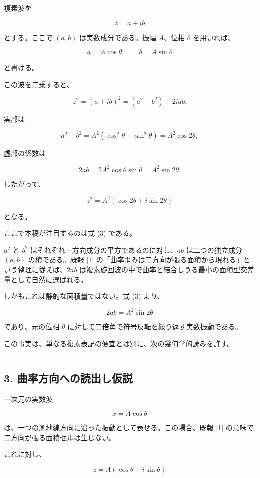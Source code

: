 \documentclass[
  a4paper,
]{ltjsarticle}
\begin{document}
複素波を

\[z=a+ib\]

とする。ここで \((a,b)\) は実数成分である。振幅 \(A\)、位相 \(\theta\)
を用いれば、

\[a=A\cos\theta,\qquad b=A\sin\theta\]

と書ける。

この波を二乗すると、

\[z^2 = (a+ib)^2 = (a^2-b^2)+2iab. \tag{1}\]

実部は

\[a^2-b^2 = A^2(\cos^2\theta-\sin^2\theta) = A^2\cos2\theta, \tag{2}\]

虚部の係数は

\[2ab = 2A^2\cos\theta\sin\theta = A^2\sin2\theta. \tag{3}\]

したがって、

\[\boxed{z^2=A^2(\cos2\theta+i\sin2\theta)} \tag{4}\]

となる。

ここで本稿が注目するのは式 (3) である。

\(a^2\) と \(b^2\) はそれぞれ一方向成分の平方であるのに対し、\(ab\)
は二つの独立成分 \((a,b)\) の積である。既報 {[}1{]}
の「曲率歪みは二方向が張る面積から現れる」という整理に従えば、\(2ab\)
は複素旋回波の中で曲率と結合しうる最小の面積型交差量として自然に選ばれる。

しかもこれは静的な面積量ではない。式 (3) より、

\[2ab=A^2\sin2\theta\]

であり、元の位相 \(\theta\)
に対して二倍角で符号反転を繰り返す実数振動である。

この事実は、単なる複素表記の便宜とは別に、次の幾何学的読みを許す。

\begin{center}\rule{0.5\linewidth}{0.5pt}\end{center}

\subsection{3.
曲率方向への読出し仮説}\label{ux66f2ux7387ux65b9ux5411ux3078ux306eux8aadux51faux3057ux4eeeux8aac}

一次元の実数波

\[x=A\cos\theta\]

は、一つの測地線方向に沿った振動として表せる。この場合、既報 {[}1{]}
の意味で二方向が張る面積セルは生じない。

これに対し、

\[z=A(\cos\theta+i\sin\theta)\]
\end{document}

